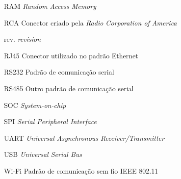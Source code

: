 \begin{siglas}
	\item[RAM] \emph{Random Access Memory}
	\item[RCA] Conector criado pela \emph{Radio Corporation of America}
	\item[rev.] \emph{revision}
	\item[RJ45] Conector utilizado no padrão Ethernet
	\item[RS232] Padrão de comunicação serial
	\item[RS485] Outro padrão de comunicação serial
	\item[SOC] \emph{System-on-chip}
	\item[SPI] \emph{Serial Peripheral Interface}
	\item[UART] \emph{Universal Asynchronous Receiver/Transmitter}
	\item[USB] \emph{Universal Serial Bus}
	\item[Wi-Fi] Padrão de comunicação sem fio IEEE 802.11
\end{siglas}
